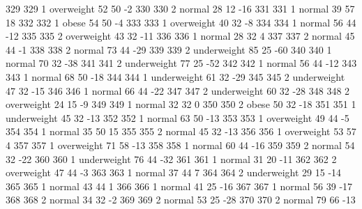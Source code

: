 \begin{Schunk}
\begin{Soutput}
		329         329   1  overweight  52         50           -2
		330         330   2      normal  28         12          -16
		331         331   1      normal  39         57           18
		332         332   1       obese  54         50           -4
		333         333   1  overweight  40         32           -8
		334         334   1      normal  56         44          -12
		335         335   2  overweight  43         32          -11
		336         336   1      normal  28         32            4
		337         337   2      normal  45         44           -1
		338         338   2      normal  73         44          -29
		339         339   2 underweight  85         25          -60
		340         340   1      normal  70         32          -38
		341         341   2 underweight  77         25          -52
		342         342   1      normal  56         44          -12
		343         343   1      normal  68         50          -18
		344         344   1 underweight  61         32          -29
		345         345   2 underweight  47         32          -15
		346         346   1      normal  66         44          -22
		347         347   2 underweight  60         32          -28
		348         348   2  overweight  24         15           -9
		349         349   1      normal  32         32            0
		350         350   2       obese  50         32          -18
		351         351   1 underweight  45         32          -13
		352         352   1      normal  63         50          -13
		353         353   1  overweight  49         44           -5
		354         354   1      normal  35         50           15
		355         355   2      normal  45         32          -13
		356         356   1  overweight  53         57            4
		357         357   1  overweight  71         58          -13
		358         358   1      normal  60         44          -16
		359         359   2      normal  54         32          -22
		360         360   1 underweight  76         44          -32
		361         361   1      normal  31         20          -11
		362         362   2  overweight  47         44           -3
		363         363   1      normal  37         44            7
		364         364   2 underweight  29         15          -14
		365         365   1      normal  43         44            1
		366         366   1      normal  41         25          -16
		367         367   1      normal  56         39          -17
		368         368   2      normal  34         32           -2
		369         369   2      normal  53         25          -28
		370         370   2      normal  79         66          -13

\end{Soutput}
\end{Schunk}

